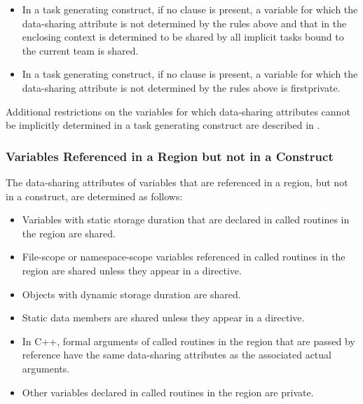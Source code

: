 \begin{itemize}
\item In a task generating construct, if no  clause is present, a 
      variable for which the data-sharing attribute is not determined by the rules 
      above and that in the enclosing context is determined to be shared by all 
      implicit tasks bound to the current team is shared.
\item In a task generating construct, if no  clause is present, a 
      variable for which the data-sharing attribute is not determined by the rules 
      above is firstprivate.
\end{itemize}

Additional restrictions on the variables for which data-sharing attributes cannot be
implicitly determined in a task generating construct are described in
.



\subsubsection{Variables Referenced in a Region but not in a Construct}
\label{subsubsec:Variables Referenced in a Region but not in a Construct}
The data-sharing attributes of variables that are referenced in a region, but not 
in a construct, are determined as follows:

\begin{ccppspecific}
\begin{itemize}
\item Variables with static storage duration that are declared in called routines 
      in the region are shared.
\item File-scope or namespace-scope variables referenced in called routines in the 
      region are shared unless they appear in a  directive.
\item Objects with dynamic storage duration are shared.
\item Static data members are shared unless they appear in a  
      directive.
\item In C++, formal arguments of called routines in the region that are passed
      by reference have the same data-sharing attributes as the associated actual 
      arguments.
\item Other variables declared in called routines in the region are private.
\end{itemize}
\end{ccppspecific}

